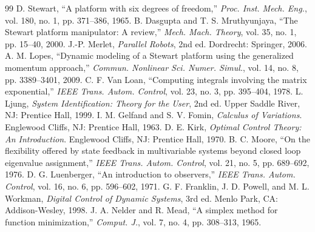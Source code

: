 \documentclass[conference]{IEEEtran}
\begin{document}
\begin{thebibliography}{99}
 D. Stewart, ``A platform with six degrees of freedom,'' \textit{Proc. Inst. Mech. Eng.}, vol. 180, no. 1, pp. 371--386, 1965.
 B. Dasgupta and T. S. Mruthyunjaya, ``The Stewart platform manipulator: A review,'' \textit{Mech. Mach. Theory}, vol. 35, no. 1, pp. 15--40, 2000.
 J.-P. Merlet, \textit{Parallel Robots}, 2nd ed. Dordrecht: Springer, 2006.
 A. M. Lopes, ``Dynamic modeling of a Stewart platform using the generalized momentum approach,'' \textit{Commun. Nonlinear Sci. Numer. Simul.}, vol. 14, no. 8, pp. 3389--3401, 2009.
 C. F. Van Loan, ``Computing integrals involving the matrix exponential,'' \textit{IEEE Trans. Autom. Control}, vol. 23, no. 3, pp. 395--404, 1978.
 L. Ljung, \textit{System Identification: Theory for the User}, 2nd ed. Upper Saddle River, NJ: Prentice Hall, 1999.
 I. M. Gelfand and S. V. Fomin, \textit{Calculus of Variations}. Englewood Cliffs, NJ: Prentice Hall, 1963.
 D. E. Kirk, \textit{Optimal Control Theory: An Introduction}. Englewood Cliffs, NJ: Prentice Hall, 1970.
 B. C. Moore, ``On the flexibility offered by state feedback in multivariable systems beyond closed loop eigenvalue assignment,'' \textit{IEEE Trans. Autom. Control}, vol. 21, no. 5, pp. 689--692, 1976.
 D. G. Luenberger, ``An introduction to observers,'' \textit{IEEE Trans. Autom. Control}, vol. 16, no. 6, pp. 596--602, 1971.
 G. F. Franklin, J. D. Powell, and M. L. Workman, \textit{Digital Control of Dynamic Systems}, 3rd ed. Menlo Park, CA: Addison-Wesley, 1998.
 J. A. Nelder and R. Mead, ``A simplex method for function minimization,'' \textit{Comput. J.}, vol. 7, no. 4, pp. 308--313, 1965.
\end{thebibliography}
\end{document}

